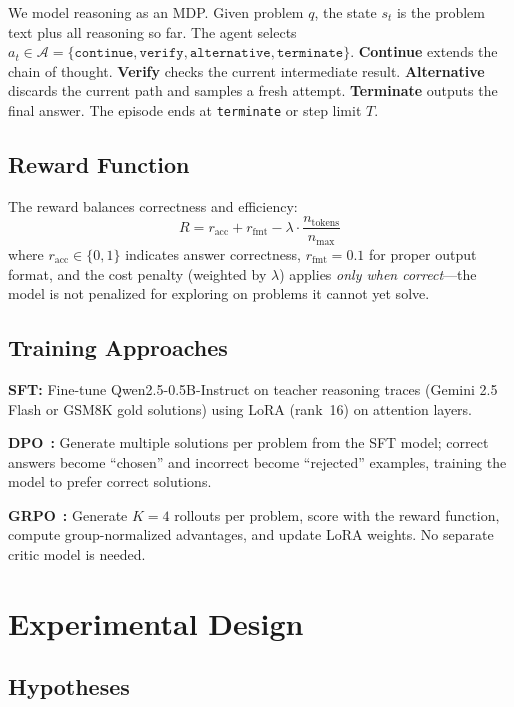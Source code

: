 \documentclass{article}
\begin{document}
We model reasoning as an MDP. Given problem $q$, the state $s_t$ is the problem text plus all reasoning so far. The agent selects $a_t \in \mathcal{A} = \{\texttt{continue}, \texttt{verify}, \texttt{alternative}, \texttt{terminate}\}$. \textbf{Continue} extends the chain of thought. \textbf{Verify} checks the current intermediate result. \textbf{Alternative} discards the current path and samples a fresh attempt. \textbf{Terminate} outputs the final answer. The episode ends at \texttt{terminate} or step limit $T$.

\subsection{Reward Function}

The reward balances correctness and efficiency:
\begin{equation}
    R = r_{\text{acc}} + r_{\text{fmt}} - \lambda \cdot \frac{n_{\text{tokens}}}{n_{\text{max}}}
\end{equation}
where $r_{\text{acc}} \in \{0, 1\}$ indicates answer correctness, $r_{\text{fmt}} = 0.1$ for proper output format, and the cost penalty (weighted by $\lambda$) applies \emph{only when correct}---the model is not penalized for exploring on problems it cannot yet solve.

\subsection{Training Approaches}

\textbf{SFT:} Fine-tune Qwen2.5-0.5B-Instruct on teacher reasoning traces (Gemini 2.5 Flash or GSM8K gold solutions) using LoRA (rank~16) on attention layers.

\textbf{DPO}~\citep{rafailov2023direct}\textbf{:} Generate multiple solutions per problem from the SFT model; correct answers become ``chosen'' and incorrect become ``rejected'' examples, training the model to prefer correct solutions.

\textbf{GRPO}~\citep{shao2024deepseekmath}\textbf{:} Generate $K{=}4$ rollouts per problem, score with the reward function, compute group-normalized advantages, and update LoRA weights. No separate critic model is needed.

\section{Experimental Design}

\subsection{Hypotheses}
\end{document}
